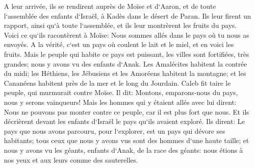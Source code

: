 \verse A leur arrivée, ils se rendirent auprès de Moïse et d`Aaron, et de toute l`assemblée des enfants d`Israël, à Kadès dans le désert de Paran. Ils leur firent un rapport, ainsi qu`à toute l`assemblée, et ils leur montrèrent les fruits du pays. 
\verse Voici ce qu`ils racontèrent à Moïse: Nous sommes allés dans le pays où tu nous as envoyés. A la vérité, c`est un pays où coulent le lait et le miel, et en voici les fruits. 
\verse Mais le peuple qui habite ce pays est puissant, les villes sont fortifiées, très grandes; nous y avons vu des enfants d`Anak. 
\verse Les Amalécites habitent la contrée du midi; les Héthiens, les Jébusiens et les Amoréens habitent la montagne; et les Cananéens habitent près de la mer et le long du Jourdain. 
\verse Caleb fit taire le peuple, qui murmurait contre Moïse. Il dit: Montons, emparons-nous du pays, nous y serons vainqueurs! 
\verse Mais les hommes qui y étaient allés avec lui dirent: Nous ne pouvons pas monter contre ce peuple, car il est plus fort que nous. 
\verse Et ils décrièrent devant les enfants d`Israël le pays qu`ils avaient exploré. Ils dirent: Le pays que nous avons parcouru, pour l`explorer, est un pays qui dévore ses habitants; tous ceux que nous y avons vus sont des hommes d`une haute taille; 
\verse et nous y avons vu les géants, enfants d`Anak, de la race des géants: nous étions à nos yeux et aux leurs comme des sauterelles. 

